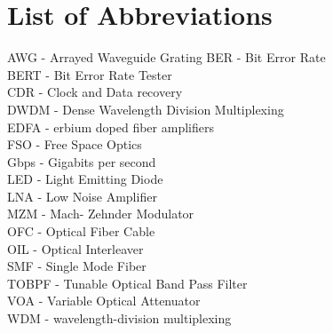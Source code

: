 \documentclass[hidelinks, 12pt]{report}
\begin{document}
\section*{List of Abbreviations}
\begin{flushleft}
AWG - Arrayed Waveguide Grating
\vspace{0.5cm}
BER - Bit Error Rate\\
\vspace{0.5cm}
BERT - Bit Error Rate Tester\\
\vspace{0.5cm}
CDR - Clock and Data recovery\\
\vspace{0.5cm}
DWDM - Dense Wavelength Division Multiplexing \\
\vspace{0.5cm}
EDFA - erbium doped fiber amplifiers\\
\vspace{0.5cm}
FSO - Free Space Optics\\ 
\vspace{0.5cm}
Gbps - Gigabits per second\\
\vspace{0.5cm}
LED - Light Emitting Diode\\
\vspace{0.5cm}
LNA - Low Noise Amplifier\\
\vspace{0.5cm}
MZM - Mach- Zehnder Modulator \\
\vspace{0.5cm}
OFC - Optical Fiber Cable\\
\vspace{0.5cm}
OIL - Optical Interleaver\\
\vspace{0.5cm}
SMF - Single Mode Fiber\\
\vspace{0.5cm}
TOBPF - Tunable Optical Band Pass Filter\\
\vspace{0.5cm}
VOA - Variable Optical Attenuator\\
\vspace{0.5cm}
WDM - wavelength-division multiplexing\\







\end{flushleft}
\pagebreak
\end{document}
